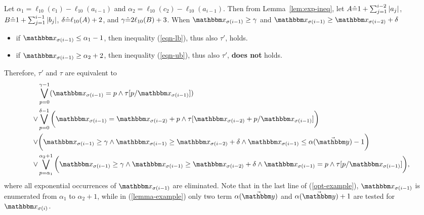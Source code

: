 Let $\alpha_1 = \ell_{10}(c_1) -  \ell_{10}(a_{i-1})$ and $\alpha_2 = \ell_{10}(c_2) -  \ell_{10}(a_{i-1})$. 
Then from Lemma~\ref{lem:exp-ineq}, let $A\hat{=} 1+\sum_{j=1}^{i-2}\vert a_j\vert$, 
$B \hat{=} 1+\sum_{j=1}^{i-1}\vert b_j\vert$, 
$\delta\hat{=}  \ell_{10}(A)+2$,
and $\gamma \hat{=} 2\ell_{10}(B)+3$. 
When $\ivarx_{\sigma(i-1)} \ge \gamma$ and $\ivarx_{\sigma(i-1)} \ge \ivarx_{\sigma(i-2)} + \delta$

\begin{itemize}
\item if $\ivarx_{\sigma(i-1)} \le \alpha_1 - 1$, then inequality (\ref{eqn-lb}), thus also $\tau'$, holds.
\item if $\ivarx_{\sigma(i-1)} \ge \alpha_2 + 2$, then inequality (\ref{eqn-ub}), thus also $\tau'$, \textbf{does not} holds.
\end{itemize}

Therefore, $\tau'$ and $\tau$ are equivalent to 
\begin{equation}\label{opt-example}\begin{aligned}
    &\bigvee_{p=0}^{\gamma-1} (\ivarx_{\sigma(i-1)}=p \wedge \tau[p/\ivarx_{\sigma(i-1)}])\\
    \vee &\bigvee_{p=0}^{\delta-1} \bigg(\ivarx_{\sigma(i-1)}=\ivarx_{\sigma(i-2)}+p\wedge \tau[\ivarx_{\sigma(i-2)}+p/\ivarx_{\sigma(i-1)}]\bigg)\\
    \vee & \bigg( \ivarx_{\sigma(i-1)}\ge \gamma \wedge \ivarx_{\sigma(i-1)} \ge \ivarx_{\sigma(i-2)}+\delta \wedge \ivarx_{\sigma(i-1)}\le \alpha(\vec\ivary)-1\bigg)\\
    \vee & \bigvee_{p=\alpha_1}^{\alpha_2+1} \bigg( \ivarx_{\sigma(i-1)}\ge \gamma \wedge \ivarx_{\sigma(i-1)} \ge \ivarx_{\sigma(i-2)}+\delta \wedge \ivarx_{\sigma(i-1)} = p \wedge \tau[p/\ivarx_{\sigma(i-1)}]\bigg),
\end{aligned}\end{equation}
where all exponential occurrences of $\ivarx_{\sigma(i-1)}$ are eliminated. Note that in the last line of (\ref{opt-example}), $\ivarx_{\sigma(i-1)}$ is  enumerated from $\alpha_1$ to $\alpha_2+1$, while in (\ref{lemma-example}) only two term $\alpha(\vec \ivary)$ and $\alpha(\vec \ivary)+1$ are tested for $\ivarx_{\sigma(i)}$.   


